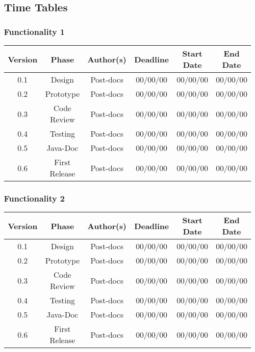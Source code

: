 \newpage
\subsection{Time Tables}

\subsubsection*{Functionality 1}

\begin{table}[H]
\begin{tabular}{cccccc}
\hline
\textbf{Version} & \textbf{Phase} & \textbf{Author(s)} & \textbf{Deadline} & \textbf{Start Date} & \textbf{End Date}\\
\hline
0.1 & Design & Post-docs & 00/00/00 & 00/00/00 & 00/00/00\\
\hline 
0.2 & Prototype & Post-docs & 00/00/00 & 00/00/00 & 00/00/00\\
\hline 
0.3 & Code Review & Post-docs & 00/00/00 & 00/00/00 & 00/00/00\\
\hline 
0.4 & Testing & Post-docs & 00/00/00 & 00/00/00 & 00/00/00\\
\hline 
0.5 & Java-Doc  & Post-docs & 00/00/00 & 00/00/00 & 00/00/00\\
\hline 
0.6 & First Release & Post-docs & 00/00/00 & 00/00/00 & 00/00/00\\
\hline
\end{tabular}
\end{table}


\subsubsection*{Functionality 2}

\begin{table}[H]
\begin{tabular}{cccccc}
\hline
\textbf{Version} & \textbf{Phase} & \textbf{Author(s)} & \textbf{Deadline} & \textbf{Start Date} & \textbf{End Date}\\
\hline
0.1 & Design & Post-docs & 00/00/00 & 00/00/00 & 00/00/00\\
\hline 
0.2 & Prototype & Post-docs & 00/00/00 & 00/00/00 & 00/00/00\\
\hline 
0.3 & Code Review & Post-docs & 00/00/00 & 00/00/00 & 00/00/00\\
\hline 
0.4 & Testing & Post-docs & 00/00/00 & 00/00/00 & 00/00/00\\
\hline 
0.5 & Java-Doc  & Post-docs & 00/00/00 & 00/00/00 & 00/00/00\\
\hline 
0.6 & First Release & Post-docs & 00/00/00 & 00/00/00 & 00/00/00\\
\hline
\end{tabular}
\end{table}